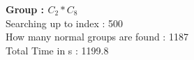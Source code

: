 \textbf{Group : $C_2*C_8$}\\
Searching up to index : 500\\
How many normal groups are found : 1187\\
Total Time in s : 1199.8\\
